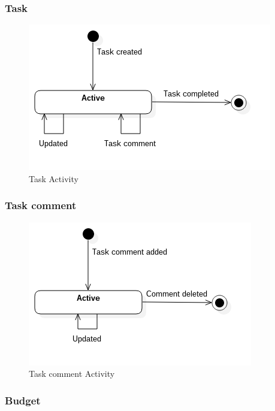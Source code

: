\subsubsection*{Task}

\begin{figure}[H]
    \centering
    \includegraphics[scale=0.6]{Images/ProblemDomain/taskActivityDiagram.png}
    \caption{Task Activity}
    \label{fig:taskActivityDiagram}
\end{figure}

\subsubsection*{Task comment}

\begin{figure}[H]
    \centering
    \includegraphics[scale=0.6]{Images/ProblemDomain/tcActivityDiagram.png}
    \caption{Task comment Activity}
    \label{fig:tcActivityDiagram}
\end{figure}

\subsubsection*{Budget}

